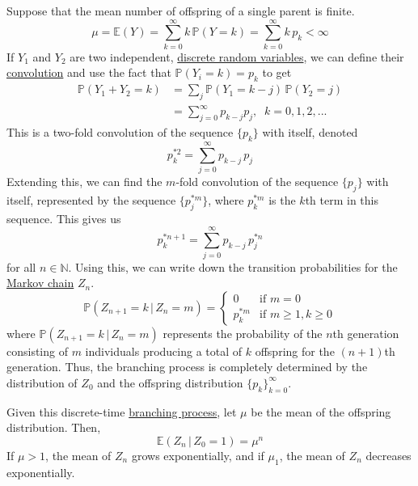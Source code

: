     Suppose that the mean number of offspring of a single parent is finite. 
    \begin{equation}
      \mu = \mathbb{E}(Y) = \sum_{k=0}^\infty k \, \mathbb{P}(Y = k) = \sum_{k=0}^\infty k \, p_k < \infty
    \end{equation}
    If $Y_1$ and $Y_2$ are two independent, \hyperref[def:discrete-random-variable]{discrete random variables}, we can define their \hyperref[def:convolution]{convolution} and use the fact that $\mathbb{P}(Y_i = k) = p_k$ to get
    \begin{align*}
      \mathbb{P}(Y_1 + Y_2 = k) & = \sum_j \mathbb{P}(Y_1 = k - j) \, \mathbb{P}(Y_2 = j) \\
      & = \sum_{j=0}^\infty p_{k-j} p_j, \;\; k = 0, 1, 2, ...
    \end{align*}
    This is a two-fold convolution of the sequence $\{p_k\}$ with itself, denoted
    \begin{equation}
      p_k^{*2} = \sum_{j=0}^\infty p_{k-j} \, p_j
    \end{equation}
    Extending this, we can find the $m$-fold convolution of the sequence $\{p_j\}$ with itself, represented by the sequence $\{p_j^{*m}\}$, where $p_k^{*m}$ is the $k$th term in this sequence. This gives us
    \begin{equation}
      p_k^{*n+1} = \sum_{j=0}^\infty p_{k-j} \, p_j^{*n}
    \end{equation}
    for all $n \in \mathbb{N}$. Using this, we can write down the transition probabilities for the \hyperref[def:markov-chain]{Markov chain} $Z_n$. 
    \begin{equation}
      \mathbb{P}(Z_{n+1} = k \, | \, Z_n = m) = \begin{cases}
      0 & \text{if } m = 0 \\
      p_k^{*m} & \text{if } m \geq 1, k \geq 0
      \end{cases}
    \end{equation}
    where $\mathbb{P}(Z_{n+1} = k \, | \, Z_n = m)$ represents the probability of the $n$th generation consisting of $m$ individuals producing a total of $k$ offspring for the $(n+1)$th generation. Thus, the branching process is completely determined by the distribution of $Z_0$ and the offspring distribution $\{p_k\}_{k=0}^\infty$. 

    \begin{lemma}
      \label{thm:mean-population-size-of-a-branching-process}
      Given this discrete-time \hyperref[def:branching-process]{branching process}, let $\mu$ be the mean of the offspring distribution. Then, 
      \begin{equation}
        \mathbb{E}(Z_n \, | \, Z_0 = 1) = \mu^n
      \end{equation}
      If $\mu > 1$, the mean of $Z_n$ grows exponentially, and if $\mu_1$, the mean of $Z_n$ decreases exponentially. 
    \end{lemma}

